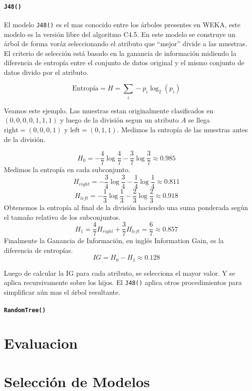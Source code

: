 \documentclass[10pt,a4paper]{article}
\begin{document}
\subsection{\lstinline{J48()}}
El modelo \lstinline{J48()} es el mas conocido entre los árboles presentes en WEKA, este modelo es la versión libre del algoritmo C4.5. En este modelo se construye un árbol de forma voráz seleccionando el atributo que ``mejor'' divide a las muestras. El criterio de selección está basado en la ganancia de información midiendo la diferencia de entropía entre el conjunto de datos original y el mismo conjunto de datos divido por el atributo.

\[
\text{Entropía} = H = \sum_i -p_i \log_2(p_i)
\]

Veamos este ejemplo. Las muestras estan originalmente clasificados en $(0, 0, 0, 0, 1, 1, 1)$ y luego de la división segun un atributo $A$ se llega $\text{right}=(0, 0, 0, 1)$ y $\text{left}=(0, 1, 1)$. Medimos la entropía de las muestras antes de la división.

\[
H_0 = -\frac{4}{7} \log\frac{4}{7} -\frac{3}{7} \log\frac{3}{7} \approx 0.985
\]
Medimos la entropía en cada subconjunto.
\[
H_{right} = -\frac{3}{4} \log\frac{3}{4} - \frac{1}{4} \log\frac{1}{4} \approx 0.811
\]
\[
H_{left} = -\frac{1}{3} \log\frac{1}{3} - \frac{2}{3} \log\frac{2}{3} \approx 0.918
\]
Obtenemos la entropía al final de la división haciendo una suma ponderada según el tamaño relativo de los subconjuntos.
\[
H_1 = \frac{4}{7}H_{right} + \frac{3}{7}H_{left} = \frac{6}{7} \approx 0.857
\]
Finalmente la Ganancia de Información, en inglés Information Gain, es la diferencia de entropías.
\[
IG = H_0 - H_1 \approx 0.128
\]

Luego de calcular la IG para cada atributo, se selecciona el mayor valor. Y se aplica recursivamente sobre los hijos. El \lstinline{J48()} aplica otros procedimientos para simplificar aún mas el árbol resultante.

\subsection{\lstinline{RandomTree()}}

\part{Evaluacion}

\part{Selección de Modelos}
\end{document}
